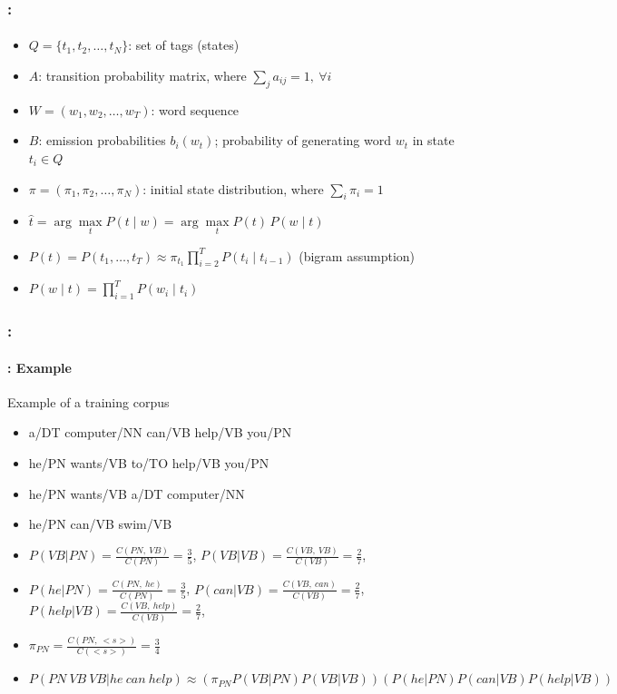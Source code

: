 \documentclass[xcolor=table]{beamer}
\begin{document}
\begin{frame}[fragile]
	\frametitle{\insertshortsubtitle: \insertsection}
	\framesubtitle{\insertsubsection}
	
	\begin{itemize}
		\item $Q = \{t_1, t_2, \ldots, t_N\}$: set of tags (states)
		\item $A$: transition probability matrix, where $\sum_j a_{ij} = 1,\ \forall i$
		\item $W = (w_1, w_2, \ldots, w_T)$: word sequence
		\item $B$: emission probabilities $b_i(w_t)$; probability of generating word $w_t$ in state $t_i \in Q$
		\item $\pi = (\pi_1, \pi_2, \ldots, \pi_N)$: initial state distribution, where $\sum_i \pi_i = 1$
		
		\item $\hat{t} = \arg\max\limits_t P(t \mid w) = \arg\max\limits_t P(t)\,P(w \mid t)$
		
		\item $P(t) = P(t_1, \ldots, t_T) \approx \pi_{t_1} \prod\limits_{i=2}^{T} P(t_i \mid t_{i-1})$ \quad (bigram assumption)
		
		\item $P(w \mid t) = \prod\limits_{i=1}^{T} P(w_i \mid t_i)$
	\end{itemize}

\end{frame}

\begin{frame}
	\frametitle{\insertshortsubtitle: \insertsection}
	\framesubtitle{\insertsubsection: Example}

	\begin{exampleblock}{Example of a training corpus}
		\begin{itemize}
			\item a/DT computer/NN can/VB help/VB you/PN
			\item he/PN wants/VB to/TO help/VB you/PN
			\item he/PN wants/VB a/DT computer/NN
			\item he/PN can/VB swim/VB
		\end{itemize}
	\end{exampleblock}
	
	\begin{itemize}
		\item $P(VB | PN) = \frac{C(PN,\ VB)}{C(PN)} = \frac{3}{5}$, 
			  $P(VB | VB) = \frac{C(VB,\ VB)}{C(VB)} = \frac{2}{7}$,
		\item $P(he | PN) = \frac{C(PN,\ he)}{C(PN)} = \frac{3}{5}$,
		      $P(can | VB) = \frac{C(VB,\ can)}{C(VB)} = \frac{2}{7}$,
			  $P(help | VB) = \frac{C(VB,\ help)}{C(VB)} = \frac{2}{7}$,
		\item $\pi_{PN} = \frac{C(PN,\ <s>)}{C(<s>)} = \frac{3}{4} $
		\item $P(PN\ VB\ VB | he\ can\ help) \approx (\pi_{PN} P(VB | PN) P(VB | VB)) (P(he | PN) P(can | VB) P(help | VB)) $
	\end{itemize}

\end{frame}
\end{document}
